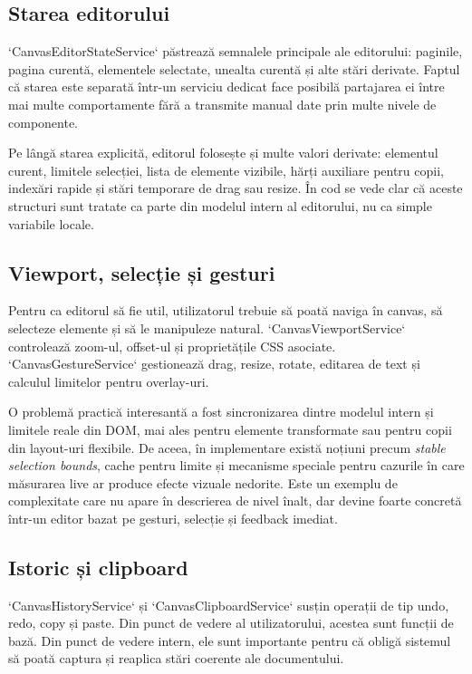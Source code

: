 \subsection{Starea editorului}

`CanvasEditorStateService` păstrează semnalele principale ale editorului: paginile, pagina curentă, elementele selectate, unealta curentă și alte stări derivate. Faptul că starea este separată într-un serviciu dedicat face posibilă partajarea ei între mai multe comportamente fără a transmite manual date prin multe nivele de componente.

Pe lângă starea explicită, editorul folosește și multe valori derivate: elementul curent, limitele selecției, lista de elemente vizibile, hărți auxiliare pentru copii, indexări rapide și stări temporare de drag sau resize. În cod se vede clar că aceste structuri sunt tratate ca parte din modelul intern al editorului, nu ca simple variabile locale.

\subsection{Viewport, selecție și gesturi}

Pentru ca editorul să fie util, utilizatorul trebuie să poată naviga în canvas, să selecteze elemente și să le manipuleze natural. `CanvasViewportService` controlează zoom-ul, offset-ul și proprietățile CSS asociate. `CanvasGestureService` gestionează drag, resize, rotate, editarea de text și calculul limitelor pentru overlay-uri.

O problemă practică interesantă a fost sincronizarea dintre modelul intern și limitele reale din DOM, mai ales pentru elemente transformate sau pentru copii din layout-uri flexibile. De aceea, în implementare există noțiuni precum \textit{stable selection bounds}, cache pentru limite și mecanisme speciale pentru cazurile în care măsurarea live ar produce efecte vizuale nedorite. Este un exemplu de complexitate care nu apare în descrierea de nivel înalt, dar devine foarte concretă într-un editor bazat pe gesturi, selecție și feedback imediat.

\subsection{Istoric și clipboard}

`CanvasHistoryService` și `CanvasClipboardService` susțin operații de tip undo, redo, copy și paste. Din punct de vedere al utilizatorului, acestea sunt funcții de bază. Din punct de vedere intern, ele sunt importante pentru că obligă sistemul să poată captura și reaplica stări coerente ale documentului.

